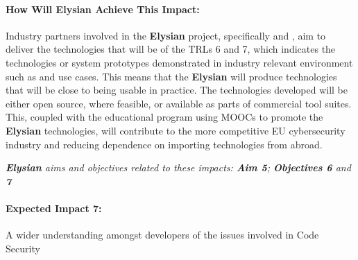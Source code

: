 \documentclass[a4paper,11pt]{article}
\newcommand{\project}[1]{\textbf{#1}\xspace}
\newcommand{\SECURITY}{\project{Elysian}}
\newcommand{\TheProject}{\SECURITY}
\begin{document}
\begin{mdframed}[backgroundcolor=gray!10]
\paragraph{How Will \TheProject{} Achieve This Impact:}
Industry partners involved in the \TheProject{} project, specifically \IBMshort{} and \YAGshort{}, aim to deliver the technologies that will be of the TRLs 6 and 7, which indicates the technologies or system prototypes demonstrated in industry relevant environment such as \SOPRAshort{} and \DEMshort{} use cases. This means that the \TheProject{} will produce technologies that will be close to being usable in practice. The technologies developed will be either open source, where feasible, or available as parts of commercial tool suites. This, coupled with the educational program using MOOCs to promote the \TheProject{} technologies, will contribute to the more competitive EU cybersecurity industry and reducing dependence on importing technologies from abroad.

\emph{\TheProject{} aims and objectives related to these impacts: \textbf{Aim 5}; \textbf{Objectives 6} and \textbf{7}}
\end{mdframed}




\begin{mdframed}[backgroundcolor=blue!5]
\paragraph{Expected Impact 7:}
A wider understanding amongst developers of the issues involved in Code Security
\end{mdframed}
\end{document}
